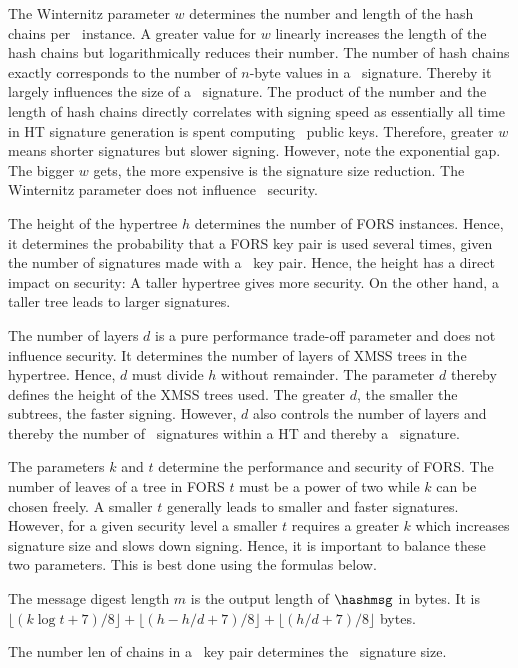 The Winternitz parameter $w$ determines the number and length of the hash chains per \WOTSCS\ instance. A greater value for $w$ linearly increases the length of the hash chains but logarithmically reduces their number. The number of hash chains exactly corresponds to the number of $n$-byte values in a \WOTSCS\ signature. Thereby it largely influences the size of a \SPHINCSA\ signature. The product of the number and the length of hash chains directly correlates with signing speed as essentially all time in HT signature generation is spent computing \WOTSCS\ public keys. Therefore, greater $w$ means shorter signatures but slower signing. However, note the exponential gap. The bigger $w$ gets, the more expensive is the signature size reduction. The Winternitz parameter does not influence \SPHINCSA\ security.

The height of the hypertree $h$ determines the number of FORS instances. Hence, it determines the probability that a FORS key pair is used several times, given the number of signatures made with a \SPHINCSA\ key pair. Hence, the height has a direct impact on security: A taller hypertree gives more security. On the other hand, a taller tree leads to larger signatures.

The number of layers $d$ is a pure performance trade-off parameter and does not influence security. It determines the number of layers of XMSS trees in the hypertree. Hence, $d$ must divide $h$ without remainder. The parameter $d$ thereby defines the height of the XMSS trees used. The greater $d$, the smaller the subtrees, the faster signing. However, $d$ also controls the number of layers and thereby the number of \WOTSCS\ signatures within a HT and thereby a \SPHINCSA\ signature.

The parameters $k$ and $t$ determine the performance and security of FORS. The number of leaves of a tree in FORS $t$ must be a power of two while $k$ can be chosen freely. A smaller $t$ generally leads to smaller and faster signatures. However, for a given security level a smaller $t$ requires a greater $k$ which increases signature size and slows down signing. Hence, it is important to balance these two parameters. This is best done using the formulas below.

The message digest length $m$ is the output length of $\hashmsg$ in bytes. It is $\lfloor(k\log t+7)/8\rfloor+ \lfloor(h-h/d+7)/8\rfloor+\lfloor(h/d+7)/8\rfloor$ bytes.

The number len of chains in a \WOTSCS\ key pair determines the \WOTSCS\ signature size.

